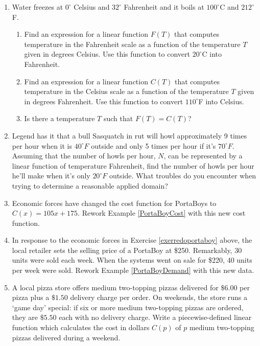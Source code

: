 \begin{enumerate}
\item Water freezes at $0^{\circ}$ Celsius and $32^{\circ}$ Fahrenheit and it boils at $100^{\circ}$C and $212^{\circ}$F.  
\label{celsiustofahr}

\begin{enumerate}

\item Find an expression for a  linear function $F(T)$ that computes temperature in the Fahrenheit scale as a function of  the temperature $T$ given in degrees Celsius.  Use this function to convert $20^{\circ}$C into Fahrenheit.

\item Find an expression for a  linear function $C(T)$ that computes temperature in the Celsius scale as a function of  the temperature $T$ given in degrees Fahrenheit.  Use this function to convert $110^{\circ}$F into Celsius.

\item Is there a temperature $T$ such that $F(T) = C(T)$?

\end{enumerate}

\enlargethispage{0.5in}

\item Legend has it that a bull Sasquatch in rut will howl approximately 9 times per hour when it is $40^{\circ}F$ outside and only 5 times per hour if it's $70^{\circ}F$.  Assuming that the number of howls per hour, $N$, can be represented by a linear function of temperature Fahrenheit, find the number of howls per hour he'll make when it's only $20^{\circ}F$ outside. What troubles do you encounter when trying to determine a reasonable applied domain?

\item \label{exerredoportaboy} Economic forces have changed the cost function for PortaBoys to $C(x) = 105x + 175$.  Rework Example \ref{PortaBoyCost} with this new cost function.

\item In response to the economic forces in Exercise \ref{exerredoportaboy} above, the local retailer sets the selling price of a PortaBoy at \$250.  Remarkably, 30 units were sold each week.  When the systems went on sale for \$220, 40 units per week were sold.  Rework Example \ref{PortaBoyDemand}  with this new data.

\item A local pizza store offers medium two-topping pizzas delivered for $\$6.00$ per pizza plus a $\$1.50$ delivery charge per order.  On weekends, the store runs a `game day' special:  if six or more medium two-topping pizzas are ordered, they are $\$5.50$ each with no delivery charge.  Write a piecewise-defined linear function which calculates the cost in dollars $C(p)$ of  $p$ medium two-topping pizzas delivered during a weekend.


\end{enumerate}
